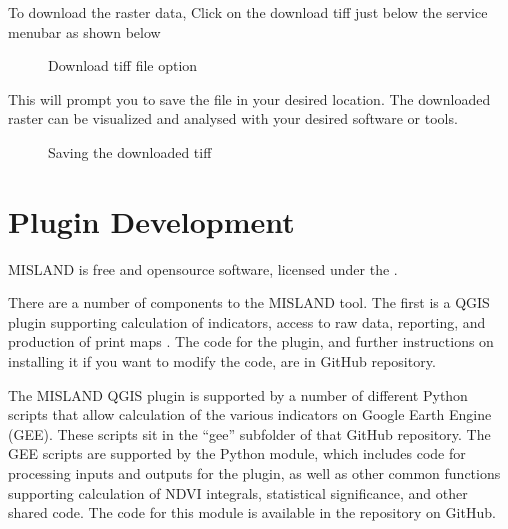 \documentclass[letterpaper,10pt,english]{sphinxmanual}
\let\sphinxpxdimen\pdfpxdimen\else\newdimen\sphinxpxdimen
\begin{document}
\sphinxAtStartPar
To download the raster data, Click on the download tiff just below the service menu\sphinxhyphen{}bar as shown below

\begin{figure}[H]
\centering
\capstart

\noindent\sphinxincludegraphics[width=209\sphinxpxdimen,height=85\sphinxpxdimen]{{download2}.png}
\caption{Download tiff file option}\label{\detokenize{Service/Download_data:id3}}\end{figure}

\sphinxAtStartPar
This will prompt you to save the file in your desired location. The downloaded raster can be visualized and analysed with your desired software or tools.

\begin{figure}[H]
\centering
\capstart

\noindent\sphinxincludegraphics[width=653\sphinxpxdimen,height=522\sphinxpxdimen]{{download3}.png}
\caption{Saving the downloaded tiff}\label{\detokenize{Service/Download_data:id4}}\end{figure}

\sphinxstepscope


\chapter{Plugin Development}
\label{\detokenize{Qgis_Plugin/plugin_development:plugin-development}}\label{\detokenize{Qgis_Plugin/plugin_development::doc}}
\sphinxAtStartPar
MISLAND is free and open\sphinxhyphen{}source software, licensed under the .

\sphinxAtStartPar
There are a number of components to the MISLAND tool. The first is a
QGIS plugin supporting calculation of indicators, access to raw data,
reporting, and production of print maps . The code for the plugin, and further
instructions on installing it if you want to modify the code, are in
GitHub repository.

\sphinxAtStartPar
The MISLAND QGIS plugin is supported by a number of different Python
scripts that allow calculation of the various indicators on Google Earth Engine
(GEE). These scripts sit in the “gee” sub\sphinxhyphen{}folder of that GitHub repository. The
GEE scripts are supported by the  Python module, which
includes code for processing inputs and outputs for the plugin, as well as
other common functions supporting calculation of NDVI integrals, statistical
significance, and other shared code. The code for this module is available in
the  repository on
GitHub.
\end{document}
